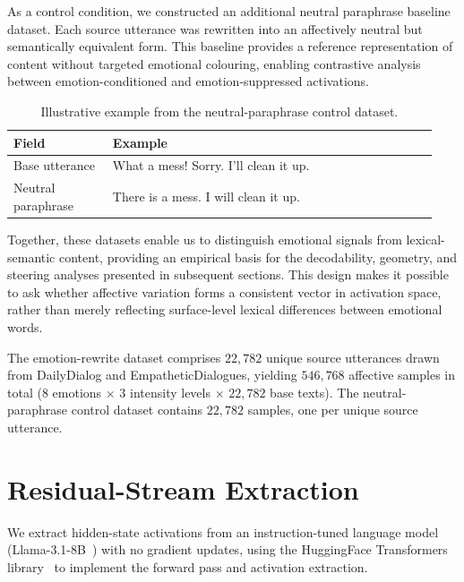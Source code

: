 As a control condition, we constructed an additional neutral paraphrase baseline dataset. Each source utterance was rewritten into an affectively neutral but semantically equivalent form. This baseline provides a reference representation of content without targeted emotional colouring, enabling contrastive analysis between emotion-conditioned and emotion-suppressed activations. \par

\begin{table}[H]
\centering
\small
\begin{tabular}{p{0.22\linewidth} p{0.72\linewidth}}
\toprule
\textbf{Field} & \textbf{Example} \\
\midrule
Base utterance & What a mess!  Sorry. I'll clean it up. \\
Neutral paraphrase & There is a mess. I will clean it up. \\
\bottomrule
\end{tabular}
\caption{Illustrative example from the neutral-paraphrase control dataset.}
\label{tab:neutral_rewrite_example}
\end{table}

Together, these datasets enable us to distinguish emotional signals from lexical-semantic content, providing an empirical basis for the decodability, geometry, and steering analyses presented in subsequent sections. This design makes it possible to ask whether affective variation forms a consistent vector in activation space, rather than merely reflecting surface-level lexical differences between emotional words.\par

The emotion-rewrite dataset comprises $22{,}782$ unique source utterances drawn from DailyDialog and EmpatheticDialogues, yielding $546{,}768$ affective samples in total ($8$ emotions $\times$ $3$ intensity levels $\times$ $22{,}782$ base texts). The neutral-paraphrase control dataset contains $22{,}782$ samples, one per unique source utterance.

\section{Residual-Stream Extraction}
\label{sec:residual_extraction}

We extract hidden-state activations from an instruction-tuned language model (Llama-3.1-8B~\cite{meta2024llama318b}) with no gradient updates, using the HuggingFace Transformers library~\cite{wolf2020huggingfacestransformersstateoftheartnatural} to implement the forward pass and activation extraction.

